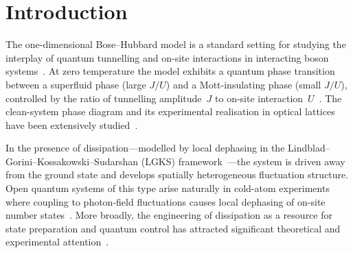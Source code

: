 \documentclass[aps,pra,reprint,amsmath,amssymb,longbibliography,floatfix]{revtex4-2}
\newcommand{\Fi}{F_i}
\begin{document}
\begin{abstract}
$\gamma_{\mathrm{extra}}=0.5$--$1.0$ and collapses at very high rates,
confirming that the paper's choice $\gamma_{\mathrm{extra}}=0.5$ is
near-optimal.
Taken together, local number variance functions as a finite-size,
regime-dependent redistribution handle in the positive pocket
($J/U\geq0.30$): it identifies intervention subsets with enhanced
finite-horizon response, and this advantage is not reducible to geometric
centrality, shell position, mean occupation, or disorder amplitude, while
surviving the tested deterministic symmetry-breaking controls.
Because the systems are small enough for exhaustive enumeration, we further
rank the $\Fi$-selected subset against all $\binom{L}{k}$ possible
intervention subsets: in the positive-pocket regime it lies at the top of
the subset-response distribution at every tested $(L,\tau)$ pair, and the
conclusion survives signed, absolute, and redistribution-based target
definitions.
Finite-difference susceptibility analysis shows that $\Fi$ is not a
local-depletion susceptibility but a redistribution susceptibility:
Spearman$(\Fi,\chi^{\mathrm{redist}})$ is positive across all regimes and
all horizons, and the top-$\Fi$ sites exactly match the highest
redistribution-susceptibility sites at $L=6$, $\tau\geq2$.
\end{abstract}

\maketitle

\section{Introduction}
\label{sec:intro}

The one-dimensional Bose--Hubbard model is a standard setting for studying
the interplay of quantum tunnelling and on-site interactions in interacting
boson systems~\cite{fisher1989,jaksch1998}.
At zero temperature the model exhibits a quantum phase transition between a
superfluid phase (large $J/U$) and a Mott-insulating phase (small $J/U$),
controlled by the ratio of tunnelling amplitude~$J$ to on-site
interaction~$U$~\cite{kuhner2000,greiner2002}.
The clean-system phase diagram and its experimental realisation in
optical lattices~\cite{jaksch2005} have been extensively
studied~\cite{greiner2002}.

In the presence of dissipation---modelled by local dephasing in the
Lindblad--Gorini--Kossakowski--Sudarshan (LGKS)
framework~\cite{lindblad1976,gorini1976,breuer2002}---the system is
driven away from the ground state and develops spatially heterogeneous
fluctuation structure.
Open quantum systems of this type arise naturally in cold-atom experiments
where coupling to photon-field fluctuations causes local dephasing of
on-site number states~\cite{pichler2010,poletti2012}.
More broadly, the engineering of dissipation as a resource for state
preparation and quantum control has attracted significant theoretical and
experimental attention~\cite{diehl2008,verstraete2009,sieberer2016,daley2014}.
\end{document}
